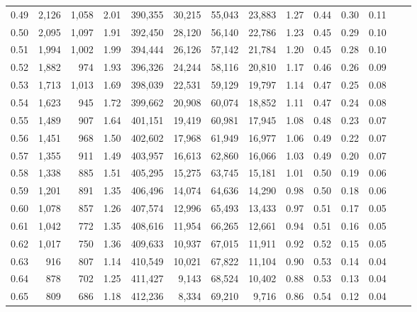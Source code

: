 \begin{tabular}{rrrrrrrrrrrrrr}
0.49 &   2,126 &  1,058 &    2.01 &  390,355 &   30,215 &  55,043 &  23,883 &  1.27 &  0.44 &  0.30 &      0.11 \\
0.50 &   2,095 &  1,097 &    1.91 &  392,450 &   28,120 &  56,140 &  22,786 &  1.23 &  0.45 &  0.29 &      0.10 \\
0.51 &   1,994 &  1,002 &    1.99 &  394,444 &   26,126 &  57,142 &  21,784 &  1.20 &  0.45 &  0.28 &      0.10 \\
0.52 &   1,882 &    974 &    1.93 &  396,326 &   24,244 &  58,116 &  20,810 &  1.17 &  0.46 &  0.26 &      0.09 \\
0.53 &   1,713 &  1,013 &    1.69 &  398,039 &   22,531 &  59,129 &  19,797 &  1.14 &  0.47 &  0.25 &      0.08 \\
0.54 &   1,623 &    945 &    1.72 &  399,662 &   20,908 &  60,074 &  18,852 &  1.11 &  0.47 &  0.24 &      0.08 \\
0.55 &   1,489 &    907 &    1.64 &  401,151 &   19,419 &  60,981 &  17,945 &  1.08 &  0.48 &  0.23 &      0.07 \\
0.56 &   1,451 &    968 &    1.50 &  402,602 &   17,968 &  61,949 &  16,977 &  1.06 &  0.49 &  0.22 &      0.07 \\
0.57 &   1,355 &    911 &    1.49 &  403,957 &   16,613 &  62,860 &  16,066 &  1.03 &  0.49 &  0.20 &      0.07 \\
0.58 &   1,338 &    885 &    1.51 &  405,295 &   15,275 &  63,745 &  15,181 &  1.01 &  0.50 &  0.19 &      0.06 \\
0.59 &   1,201 &    891 &    1.35 &  406,496 &   14,074 &  64,636 &  14,290 &  0.98 &  0.50 &  0.18 &      0.06 \\
0.60 &   1,078 &    857 &    1.26 &  407,574 &   12,996 &  65,493 &  13,433 &  0.97 &  0.51 &  0.17 &      0.05 \\
0.61 &   1,042 &    772 &    1.35 &  408,616 &   11,954 &  66,265 &  12,661 &  0.94 &  0.51 &  0.16 &      0.05 \\
0.62 &   1,017 &    750 &    1.36 &  409,633 &   10,937 &  67,015 &  11,911 &  0.92 &  0.52 &  0.15 &      0.05 \\
0.63 &     916 &    807 &    1.14 &  410,549 &   10,021 &  67,822 &  11,104 &  0.90 &  0.53 &  0.14 &      0.04 \\
0.64 &     878 &    702 &    1.25 &  411,427 &    9,143 &  68,524 &  10,402 &  0.88 &  0.53 &  0.13 &      0.04 \\
0.65 &     809 &    686 &    1.18 &  412,236 &    8,334 &  69,210 &   9,716 &  0.86 &  0.54 &  0.12 &      0.04 \\

\end{tabular}
